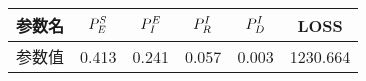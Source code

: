 \begin{tabular}{cccccc}
\hline
参数名&$\P{S}{E}$&$\P{E}{I}$&$\P{I}{R}$&$\P{I}{D}$&LOSS\\
\hline
参数值&0.413&0.241&0.057&0.003&1230.664\\
\hline
\end{tabular}